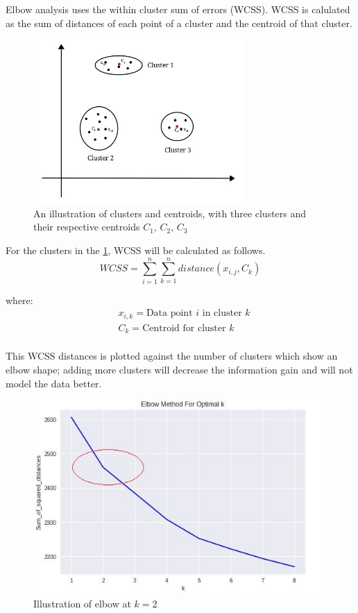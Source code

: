 Elbow analysis uses the within cluster sum of errors (WCSS). WCSS is calulated as the sum of distances of each point of a cluster and the centroid of that cluster. 

\begin{figure}[!ht]
    \centering
    \includegraphics[width=8cm,keepaspectratio]{pics/Elbow.jpg}
     \captionsetup{justification=centering,margin=2cm}
    \caption{An illustration of clusters and centroids, with three clusters and their respective centroids $C_{1}$, $C_{2}$, $C_{3}$}
    \label{fig:elbow}
\end{figure}

For the clusters in the \ref{fig:elbow}, WCSS will be calculated as follows.
\begin{equation}
   WCSS = \sum_{i=1 }^{n}\sum_{k=1}^{n}distance(x_{i,j},C_{k})
\end{equation}

where:
\begin{align*}
      & x_{i,k}=\text{Data point $i$ in cluster $k$}\\
      & C_{k}=\text{Centroid for cluster $k$}\\
\end{align*}

This WCSS distances is plotted against the number of clusters which show an elbow shape; adding more clusters will decrease the information gain and will not model the data better.

\begin{figure}[!ht]
    \centering
    \includegraphics{pics/Elbow_example.jpg}
     \captionsetup{justification=centering,margin=2cm}
    \caption{Illustration of elbow at $k =2$ }
    \label{fig:elbow_at_2}
\end{figure}

